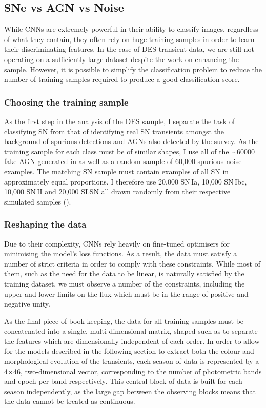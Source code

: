 \subsection{SNe vs AGN vs Noise}
While CNNs are extremely powerful in their ability to classify images, regardless of what they contain, they often rely on huge training samples in order to learn their discriminating features. In the case of DES transient data, we are still not operating on a sufficiently large dataset despite the work on enhancing the sample. However, it is possible to simplify the classification problem to reduce the number of training samples required to produce a good classification score.

\subsubsection{Choosing the training sample} \label{sec:AGNNoiseSNSample}
As the first step in the analysis of the DES sample, I separate the task of classifying SN from that of identifying real SN transients amongst the background of spurious detections and AGNs also detected by the survey. As the training sample for each class must be of similar shapes, I use all of the $\sim60000$ fake AGN generated in  as well as a random sample of 60,000 spurious noise examples. The matching SN sample must contain examples of all SN in approximately equal proportions. I therefore use 20,000 SN\,Ia, 10,000 SN\,Ibc, 10,000 SN\,II and 20,000 SLSN all drawn randomly from their respective simulated samples ().

\subsubsection{Reshaping the data}
Due to their complexity, CNNs rely heavily on fine-tuned optimisers for minimising the model's loss functions. As a result, the data must satisfy a number of strict criteria in order to comply with these constraints. While most of them, such as the need for the data to be linear, is naturally satisfied by the training dataset, we must observe a number of the constraints, including the upper and lower limits on the flux which must be in the range of positive and negative unity.

As the final piece of book-keeping, the data for all training samples must be concatenated into a single, multi-dimensional matrix, shaped such as to separate the features which are dimensionally independent of each order. In order to allow for the models described in the following section to extract both the colour and morphological evolution of the transients, each season of data is represented by a 4$\times$46, two-dimensional vector, corresponding to the number of photometric bands and epoch per band respectively. This central block of data is built for each season independently, as the large gap between the observing blocks means that the data cannot be treated as continuous.

